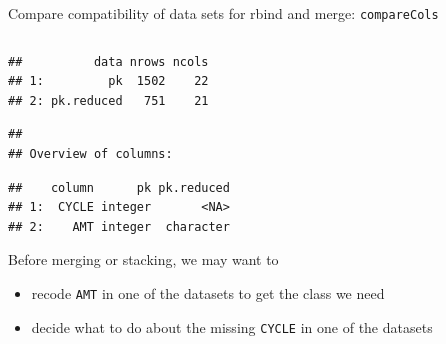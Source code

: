 \documentclass[
  8pt,
  ignorenonframetext,
  aspectratio=169]{beamer}
\providecommand{\tightlist}{%
  \setlength{\itemsep}{0pt}\setlength{\parskip}{0pt}}
\begin{document}
\begin{frame}[fragile]{Compare compatibility of data sets for rbind and
merge: \texttt{compareCols}}
\begin{columns}[T]
\begin{column}{0.48\textwidth}
\begin{verbatim}
##          data nrows ncols
## 1:         pk  1502    22
## 2: pk.reduced   751    21
\end{verbatim}

\begin{verbatim}
## 
## Overview of columns:
\end{verbatim}

\begin{verbatim}
##    column      pk pk.reduced
## 1:  CYCLE integer       <NA>
## 2:    AMT integer  character
\end{verbatim}

\vspace{12pt}

Before merging or stacking, we may want to

\begin{itemize}
\tightlist
\item
  recode \texttt{AMT} in one of the datasets to get the class we need
\item
  decide what to do about the missing \texttt{CYCLE} in one of the
  datasets
\end{itemize}
\end{column}
\end{columns}
\end{frame}
\end{document}
